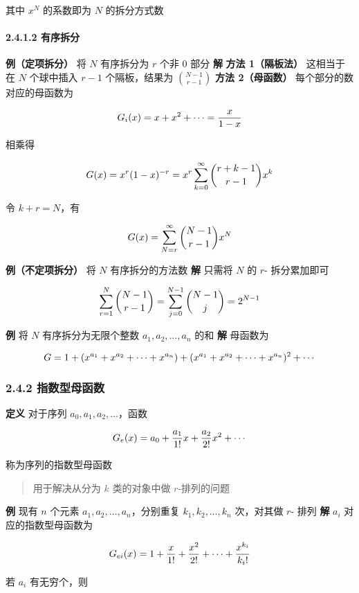 其中 \(x^N\) 的系数即为 \(N\) 的拆分方式数

\paragraph{2.4.1.2 有序拆分}\label{ux6709ux5e8fux62c6ux5206}

\textbf{例（定项拆分）} 将 \(N\) 有序拆分为 \(r\) 个非 \(0\) 部分
\textbf{解} \textbf{方法 1（隔板法）} 这相当于在 \(N\) 个球中插入
\(r-1\) 个隔板，结果为 \(\binom{N-1}{r-1}\) \textbf{方法 2（母函数）}
每个部分的数对应的母函数为

\[
\huge G_i(x)=x+x^2+\cdots=\dfrac{x}{1-x}
\]

相乘得

\[
\huge G(x)=x^r(1-x)^{-r}=x^r\sum_{k=0}^{\infty}\binom{r+k-1}{r-1}x^k
\]

令 \(k+r=N\)，有

\[
\huge G(x)=\sum_{N=r}^{\infty}\binom{N-1}{r-1}x^N
\]

\textbf{例（不定项拆分）} 将 \(N\) 有序拆分的方法数 \textbf{解} 只需将
\(N\) 的 \(r\)- 拆分累加即可

\[
\huge \sum_{r=1}^N\binom{N-1}{r-1}=\sum_{j=0}^{N-1}\binom{N-1}{j}=2^{N-1}
\]

\textbf{例} 将 \(N\) 有序拆分为无限个整数 \(a_1,a_2,…,a_n\) 的和
\textbf{解} 母函数为

\[
\huge G=1+(x^{a_1}+x^{a_2}+\cdots+x^{a_n})+(x^{a_1}+x^{a_2}+\cdots+x^{a_n})^2+\cdots
\]

\subsubsection{2.4.2
指数型母函数}\label{ux6307ux6570ux578bux6bcdux51fdux6570}

\textbf{定义} 对于序列 \(a_0,a_1,a_2,…\)，函数

\[
\huge G_e(x)=a_0+\dfrac{a_1}{1!}x+\dfrac{a_2}{2!}x^2+\cdots
\]

称为序列的指数型母函数

\begin{quote}
用于解决从分为 \(k\) 类的对象中做 \(r\)-排列的问题
\end{quote}

\textbf{例} 现有 \(n\) 个元素 \(a_1,a_2,…,a_n\)，分别重复
\(k_1,k_2,…,k_n\) 次，对其做 \(r\)- 排列 \textbf{解} \(a_i\)
对应的指数型母函数为

\[
\huge G_{ei}(x)=1+\dfrac{x}{1!}+\dfrac{x^2}{2!}+\cdots+\dfrac{x^{k_i}}{k_i!}
\]

若 \(a_i\) 有无穷个，则

